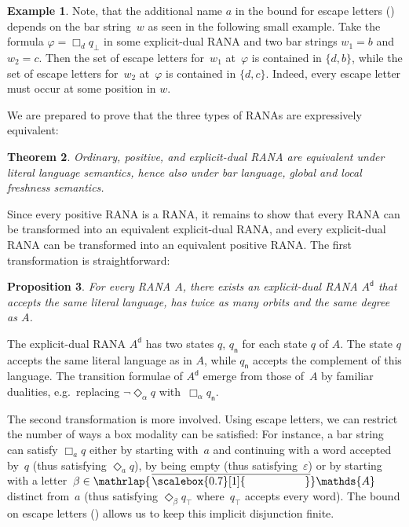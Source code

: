 \documentclass[10pt,a4paper]{amsart}
\newtheorem{theo}{Theorem}[section]
\newtheorem{prop}[theo]{Proposition}
\theoremstyle{definition}
\newtheorem{example}[theo]{Example}
\newcommand{\At}{\mathds{A}}
\newcommand{\negsym}{\mathsf{n}}
\newcommand{\negstate}[1]{#1_{\negsym}}
\newcommand{\dual}[1]{{#1}^\mathsf{d}}
\renewcommand{\epsilon}{\varepsilon}
\newcommand{\names}{\At}
\newcommand{\set}[1]{\{#1\}}
\newcommand{\mybar}[3]{%
  \mathrlap{\hspace{#2}\overline{\scalebox{#1}[1]{\phantom{\ensuremath{#3}}}}}\ensuremath{#3}
}
\newcommand{\barNames}{{\mybar{0.7}{1.25pt}{\names}}}
\begin{document}
\begin{example}\label{rem:boundEscapes:Example}
  Note, that the additional name $a$ in the bound for escape letters
  () depends on the bar string~$w$ as seen in the
  following small example. Take the formula \mbox{$\varphi = \Box_d q_\bot$} in some
  explicit-dual RANA and two bar strings $w_1 = b$ and $w_2 = c$. Then the
  set of escape letters for~$w_1$ at~$\varphi$ is contained in $\set{d, b}$,
  while the set of escape letters for~$w_2$ at~$\varphi$ is contained in $\set{d, c}$.
  Indeed, every escape letter must occur at some position in $w$.
\end{example}

We are prepared to prove that the three types of RANAs are expressively equivalent:

\begin{theo}\label{thm:equivTypes} Ordinary,
  positive, and explicit-dual RANA are equivalent under
  literal language semantics, hence also under bar language, global and local
  freshness semantics.
\end{theo}

Since every positive RANA is a RANA, it remains to show that every RANA can be transformed into an equivalent explicit-dual RANA, and every explicit-dual RANA can be transformed into an equivalent positive RANA. The first transformation is straightforward:

\begin{prop}\label{lem:constr01}
For every RANA $A$, there exists an explicit-dual RANA $\dual{A}$ that accepts the same
  literal language, has twice as many orbits and the same degree as $A$.
\end{prop}
\begin{IEEEproof}
  The explicit-dual RANA $\dual{A}$ has two states $q$, $\negstate{q}$
  for each state $q$ of $A$. The state $q$ accepts the same literal
  language as in $A$, while $\negstate{q}$ accepts the complement of
  this language.  The transition formulae of $\dual{A}$ emerge
  from those of~$A$ by familiar dualities, e.g.~replacing
  $\neg\Diamond_\alpha q$ with~$\Box_\alpha \negstate{q}$.
\end{IEEEproof}

The second transformation is more involved.
Using escape letters, we can restrict the number of ways a box modality can be
satisfied: For instance, a bar string can satisfy $\Box_a q$ either by starting
with~$a$ and continuing with a word accepted by~$q$ (thus satisfying
$\Diamond_a q$), by being empty (thus satisfying~$\epsilon$) or by
starting with a letter~$\beta\in\barNames$ distinct from~$a$ (thus
satisfying $\Diamond_\beta q_\top$ where~$q_\top$ accepts every word).
The bound on escape letters () allows us to keep this
implicit disjunction finite.
\end{document}
